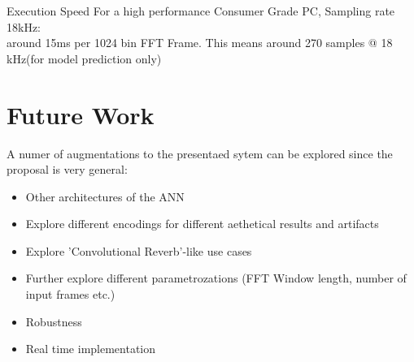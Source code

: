 \documentclass{beamer}
\begin{document}
	\begin{frame}{Execution Speed}
		For a high performance Consumer Grade PC, Sampling rate 18kHz:\\

		around 15ms per 1024 bin FFT Frame. 
		This means around 270 samples @ 18 kHz(for model prediction only)


	\end{frame}









	\section{Future Work}
	\begin{frame}
		A numer of augmentations to the presentaed sytem can be explored since the proposal is very general:
		\begin{itemize}
			\item Other architectures of the ANN
			\item Explore different encodings for different aethetical results and artifacts
			\item Explore 'Convolutional Reverb'-like use cases
			\item Further explore different parametrozations (FFT Window length, number of input frames etc.)
			\item Robustness
			\item Real time implementation
		\end{itemize}

	\end{frame}
\end{document}
